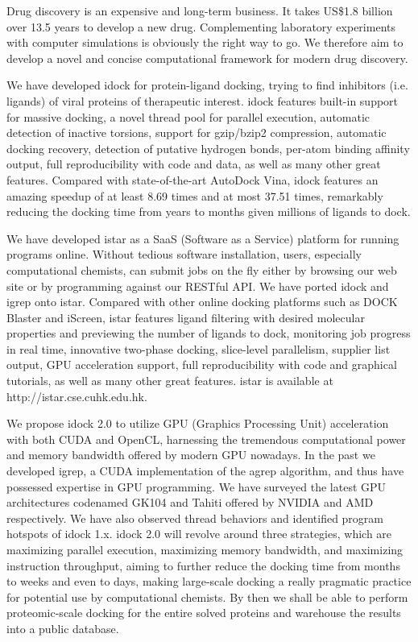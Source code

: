 Drug discovery is an expensive and long-term business. It takes US\$1.8 billion over 13.5 years to develop a new drug. Complementing laboratory experiments with computer simulations is obviously the right way to go. We therefore aim to develop a novel and concise computational framework for modern drug discovery.

We have developed idock for protein-ligand docking, trying to find inhibitors (i.e. ligands) of viral proteins of therapeutic interest. idock features built-in support for massive docking, a novel thread pool for parallel execution, automatic detection of inactive torsions, support for gzip/bzip2 compression, automatic docking recovery, detection of putative hydrogen bonds, per-atom binding affinity output, full reproducibility with code and data, as well as many other great features. Compared with state-of-the-art AutoDock Vina, idock features an amazing speedup of at least 8.69 times and at most 37.51 times, remarkably reducing the docking time from years to months given millions of ligands to dock.

We have developed istar as a SaaS (Software as a Service) platform for running programs online. Without tedious software installation, users, especially computational chemists, can submit jobs on the fly either by browsing our web site or by programming against our RESTful API. We have ported idock and igrep onto istar. Compared with other online docking platforms such as DOCK Blaster and iScreen, istar features ligand filtering with desired molecular properties and previewing the number of ligands to dock, monitoring job progress in real time, innovative two-phase docking, slice-level parallelism, supplier list output, GPU acceleration support, full reproducibility with code and graphical tutorials, as well as many other great features. istar is available at http://istar.cse.cuhk.edu.hk.

We propose idock 2.0 to utilize GPU (Graphics Processing Unit) acceleration with both CUDA and OpenCL, harnessing the tremendous computational power and memory bandwidth offered by modern GPU nowadays. In the past we developed igrep, a CUDA implementation of the agrep algorithm, and thus have possessed expertise in GPU programming. We have surveyed the latest GPU architectures codenamed GK104 and Tahiti offered by NVIDIA and AMD respectively. We have also observed thread behaviors and identified program hotspots of idock 1.x. idock 2.0 will revolve around three strategies, which are maximizing parallel execution, maximizing memory bandwidth, and maximizing instruction throughput, aiming to further reduce the docking time from months to weeks and even to days, making large-scale docking a really pragmatic practice for potential use by computational chemists. By then we shall be able to perform proteomic-scale docking for the entire solved proteins and warehouse the results into a public database.

